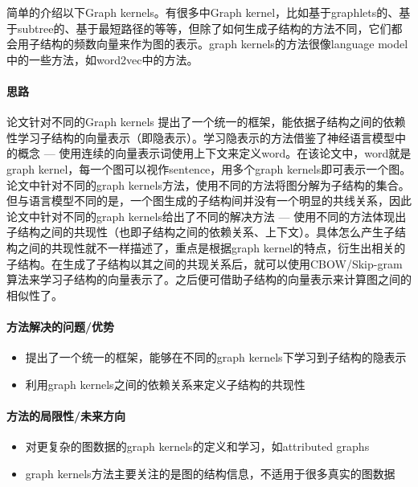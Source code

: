 简单的介绍以下Graph kernels。有很多中Graph kernel，比如基于graphlets的、基于subtree的、基于最短路径的等等，但除了如何生成子结构的方法不同，它们都会用子结构的频数向量来作为图的表示。graph kernels的方法很像language model中的一些方法，如word2vec中的方法。

\paragraph{思路}论文针对不同的Graph kernels 提出了一个统一的框架，能依据子结构之间的依赖性学习子结构的向量表示（即隐表示）。学习隐表示的方法借鉴了神经语言模型中的概念 --- 使用连续的向量表示词使用上下文来定义word。在该论文中，word就是graph kernel，每一个图可以视作sentence，用多个graph kernels即可表示一个图。论文中针对不同的graph kernels方法，使用不同的方法将图分解为子结构的集合。但与语言模型不同的是，一个图生成的子结构间并没有一个明显的共线关系，因此论文中针对不同的graph kernels给出了不同的解决方法 --- 使用不同的方法体现出子结构之间的共现性（也即子结构之间的依赖关系、上下文）。具体怎么产生子结构之间的共现性就不一样描述了，重点是根据graph kernel的特点，衍生出相关的子结构。在生成了子结构以其之间的共现关系后，就可以使用CBOW/Skip-gram算法来学习子结构的向量表示了。之后便可借助子结构的向量表示来计算图之间的相似性了。


\paragraph{方法解决的问题/优势}
\begin{itemize}
	\item 提出了一个统一的框架，能够在不同的graph kernels下学习到子结构的隐表示
	\item 利用graph kernels之间的依赖关系来定义子结构的共现性
\end{itemize}

\paragraph{方法的局限性/未来方向}
\begin{itemize}
	\item 对更复杂的图数据的graph kernels的定义和学习，如attributed graphs
	\item graph kernels方法主要关注的是图的结构信息，不适用于很多真实的图数据
\end{itemize}